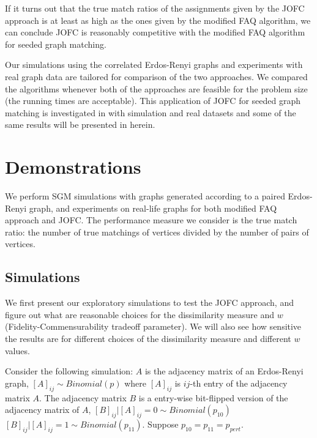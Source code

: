 \documentclass[12pt,oneside,final]{thesis}\usepackage[]{graphicx}\usepackage[]{color}
\begin{document}
If it turns out that the true match ratios of the assignments given by the JOFC approach is at least as high as the ones given by the modified FAQ algorithm, we can conclude JOFC is reasonably competitive with the modified FAQ algorithm for seeded graph matching. 

Our simulations using the correlated Erdos-Renyi graphs and experiments with real graph data are tailored for comparison of  the two approaches. We compared the algorithms whenever both of the approaches   are  feasible for the problem size (the running times are acceptable). 
 This application of JOFC for seeded graph matching is  investigated  in \cite{SGMviaJOFC} with simulation and real datasets and some of the same results will be presented in herein.
 

 
 \section{Demonstrations}

We perform SGM simulations with graphs generated according to a paired Erdos-Renyi graph, and experiments on real-life graphs for  both modified FAQ approach and JOFC. The performance measure we consider is the true match ratio: the number of true matchings of vertices  divided by the number of pairs of vertices.

\subsection{Simulations}


  We first present our exploratory simulations to  test the JOFC approach, and figure out what are reasonable choices for  the dissimilarity measure and $w$ (Fidelity-Commensurability tradeoff parameter). We will also  see how sensitive the results are for different choices of the dissimilarity measure and different $w$ values. 
 
  Consider the following simulation: $A$ is the adjacency matrix of an Erdos-Renyi graph, \ie
  $\left[A\right]_{ij} \sim Binomial(p)$ where $\left[A\right]_{ij}$ is $ij$-th entry of the adjacency matrix  $A$. The adjacency matrix  $B$ is a entry-wise bit-flipped version of the adjacency matrix of $A$, \ie
    $\left[B\right]_{ij}|\left[A\right]_{ij}=0 \sim Binomial(p_{10})$ $\left[B\right]_{ij}|\left[A\right]_{ij}=1 \sim Binomial(p_{11})$. Suppose $p_{10}=p_{11}=p_{pert}$.
  
\end{document}
